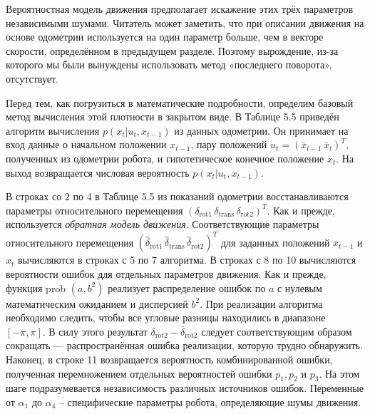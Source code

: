 \documentclass[10pt,a4paper]{article}
\begin{document}
Вероятностная модель движения предполагает искажение этих трёх параметров независимыми шумами. Читатель может заметить, что при описании движения на основе одометрии используется на один параметр больше, чем в векторе скорости, определённом в предыдущем разделе. Поэтому вырождение, из-за которого мы были вынуждены использовать метод «последнего поворота», отсутствует. 

Перед тем, как погрузиться в математические подробности, определим базовый метод вычисления этой плотности в закрытом виде. В Таблице 5.5 приведён алгоритм вычисления $p(x_t | u_t, x_{t-1})$ из данных одометрии. Он принимает на вход данные о начальном положении $x_{t-1}$, пару положений $u_t = (\bar{x}_{t-1}\, \bar{x}_t)^T$, полученных из одометрии робота, и гипотетическое конечное положение $x_t$. На выход возвращается числовая вероятность $p(x_t | u_t, x_{t-1})$.

В строках со 2 по 4 в Таблице 5.5 из показаний одометрии восстанавливаются параметры относительного перемещения $(\delta_{\text{rot}1}\,\delta_{\text{trans}}\,\delta_{\text{rot}2})^T$. Как и прежде, используется \textit{обратная модель движения}. Соответствующие параметры относительного перемещения $(\hat{\delta}_{\text{rot}1}\,\hat{\delta}_{\text{trans}}\,\hat{\delta}_{\text{rot}2})^T$ для заданных положений $x_{t-1}$ и $x_t$ вычисляются в строках с 5 по 7 алгоритма. В строках с 8 по 10 вычисляются вероятности ошибок для отдельных параметров движения. Как и прежде, функция prob $(a, b^2)$ реализует распределение ошибок по $a$ с нулевым математическим ожиданием и дисперсией $b^2$. При реализации алгоритма необходимо следить, чтобы все угловые разницы находились в диапазоне $[-\pi,\pi]$. В силу этого результат $\delta_{\text{rot}2}-\bar{\delta}_{\text{rot}2}$ следует соответствующим образом сокращать — распространённая ошибка реализации, которую трудно обнаружить. Наконец, в строке 11 возвращается вероятность комбинированной ошибки, полученная перемножением отдельных вероятностей ошибки $p_1, p_2$ и $p_3$. На этом шаге подразумевается независимость различных источников ошибок. Переменные от $\alpha_1$ до $\alpha_4$ – специфические параметры робота, определяющие шумы движения.
\end{document}
